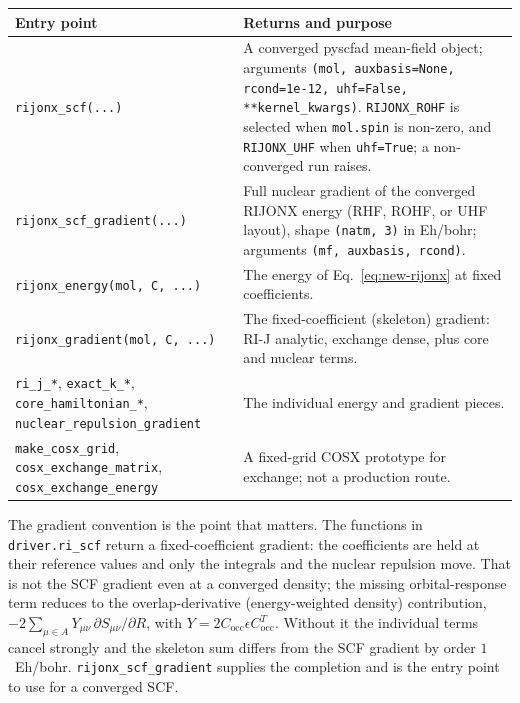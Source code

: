 \begin{center}
\small
\begin{tabularx}{\textwidth}{>{\raggedright\arraybackslash}p{}>{\raggedright\arraybackslash}X}
\toprule
Entry point & Returns and purpose \\
\midrule
\texttt{rijonx\_scf(...)} &
  A converged pyscfad mean-field object; arguments \texttt{(mol,
  auxbasis=None, rcond=1e-12, uhf=False, **kernel\_kwargs)}.
  \texttt{RIJONX\_ROHF} is selected when \texttt{mol.spin} is
  non-zero, and \texttt{RIJONX\_UHF} when \texttt{uhf=True}; a
  non-converged run raises. \\
\texttt{rijonx\_scf\_gradient(...)} &
  Full nuclear gradient of the converged RIJONX energy (RHF, ROHF, or
  UHF layout), shape \texttt{(natm, 3)} in Eh/bohr; arguments
  \texttt{(mf, auxbasis, rcond)}. \\
\texttt{rijonx\_energy(mol, C, ...)} &
  The energy of Eq.~\eqref{eq:new-rijonx} at fixed coefficients. \\
\texttt{rijonx\_gradient(mol, C, ...)} &
  The fixed-coefficient (skeleton) gradient: RI-J analytic, exchange
  dense, plus core and nuclear terms. \\
\texttt{ri\_j\_*}, \texttt{exact\_k\_*}, \texttt{core\_hamiltonian\_*}, \texttt{nuclear\_repulsion\_gradient} &
  The individual energy and gradient pieces. \\
\texttt{make\_cosx\_grid}, \texttt{cosx\_exchange\_matrix}, \texttt{cosx\_exchange\_energy} &
  A fixed-grid COSX prototype for exchange; not a production route. \\
\bottomrule
\end{tabularx}
\end{center}

The gradient convention is the point that matters.  The functions in
\texttt{driver.ri\_scf} return a fixed-coefficient gradient: the
coefficients are held at their reference values and only the integrals
and the nuclear repulsion move.  That is not the SCF gradient even at a
converged density; the missing orbital-response term reduces to the
overlap-derivative (energy-weighted density) contribution,
$-2\sum_{\mu \in A} Y_{\mu\nu}\,\partial S_{\mu\nu}/\partial R$, with
$Y = 2 C_{\mathrm{occ}}\epsilon C_{\mathrm{occ}}^{T}$.  Without it the
individual terms cancel strongly and the skeleton sum differs from the
SCF gradient by order $1$~Eh/bohr.  \texttt{rijonx\_scf\_gradient}
supplies the completion and is the entry point to use for a converged
SCF.

